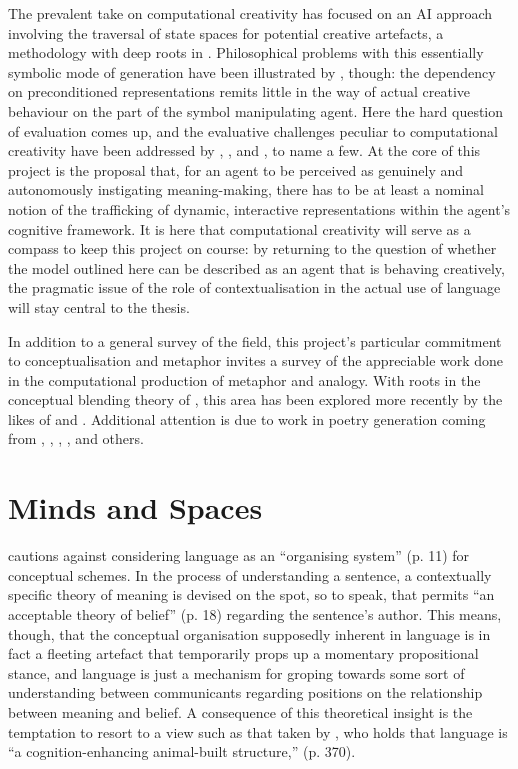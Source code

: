 The prevalent take on computational creativity has focused on an AI approach involving the traversal of state spaces for potential creative artefacts, a methodology with deep roots in \cite{Boden1990}.  Philosophical problems with this essentially symbolic mode of generation have been illustrated by \cite{McGregorEA2014}, though: the dependency on preconditioned representations remits little in the way of actual creative behaviour on the part of the symbol manipulating agent.  Here the hard question of evaluation comes up, and the evaluative challenges peculiar to computational creativity have been addressed by \cite{Ritchie2007}, \cite{ColtonEA2012B}, and \cite{Jordanous2012}, to name a few.  At the core of this project is the proposal that, for an agent to be perceived as genuinely and autonomously instigating meaning-making, there has to be at least a nominal notion of the trafficking of dynamic, interactive representations within the agent's cognitive framework.  It is here that computational creativity will serve as a compass to keep this project on course: by returning to the question of whether the model outlined here can be described as an agent that is behaving creatively, the pragmatic issue of the role of contextualisation in the actual use of language will stay central to the thesis.

In addition to a general survey of the field, this project's particular commitment to conceptualisation and metaphor invites a survey of the appreciable work done in the computational production of metaphor and analogy.  With roots in the conceptual blending theory of \cite{Turner}, this area has been explored more recently by the likes of \cite{VealeEA2007} and \cite{O'Donoghue}.  Additional attention is due to work in poetry generation coming from \cite{Gervas}, \cite{Toivonen}, \cite{Rashel}, \cite{Cardosa}, and others.

\section{Minds and Spaces}
\cite{Davidson} cautions against considering language as an ``organising system'' (p. 11) for conceptual schemes.  In the process of understanding a sentence, a contextually specific theory of meaning is devised on the spot, so to speak, that permits ``an acceptable theory of belief'' (p. 18) regarding the sentence's author.  This means, though, that the conceptual organisation supposedly inherent in language is in fact a fleeting artefact that temporarily props up a momentary propositional stance, and language is just a mechanism for groping towards some sort of understanding between communicants regarding positions on the relationship between meaning and belief.  A consequence of this theoretical insight is the temptation to resort to a view such as that taken by \cite{Clark}, who holds that language is ``a cognition-enhancing animal-built structure,'' (p. 370).


